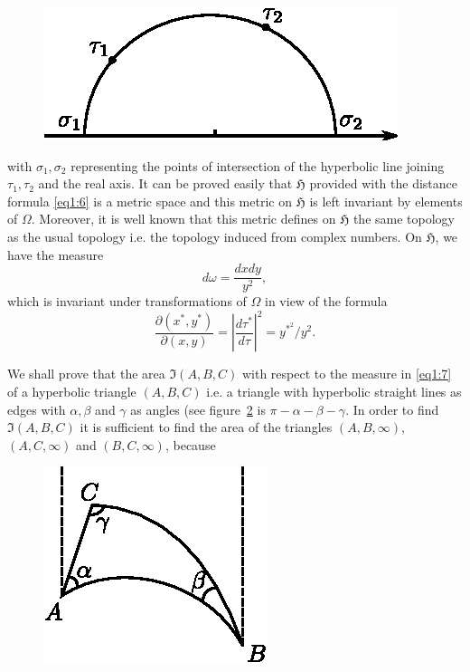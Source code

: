 \begin{figure}[H]
\centering
\includegraphics{vol29-fig/fig29-1.eps}
\smallskip
\caption{}
\label{chap1:fig1}
\end{figure}

with $\sigma_1, \sigma_2$ representing the points of intersection of
the hyperbolic line joining $\tau_1, \tau_2$ and the real axis. It can
be proved easily that $\mathfrak{H}$ provided with the distance
formula \eqref{eq1:6} is a metric space and this metric on $\mathfrak{H}$ is
left invariant by elements of $\Omega$. Moreover, it is well known
that this metric defines on $\mathfrak{H}$ the same topology as the
usual topology i.e. the topology induced from complex numbers. On
$\mathfrak{H}$, we have the measure
\begin{equation*}
d\omega = \frac{dx dy}{y^2}, \tag{7}\label{eq1:7}
\end{equation*}
which is invariant under transformations of $\Omega$ in view of the
formula
$$
\frac{\partial(x^{\ast}, y^{\ast})}{\partial(x,y)} =
\left|\frac{d\tau^{\ast}}{d\tau}\right|^2 = y^{\ast^2} /y^2.
$$

We shall prove that the area $\mathfrak{I}(A,B,C)$ with respect to the
measure in \eqref{eq1:7} of a hyperbolic triangle $(A,B,C)$ i.e. a triangle with
hyperbolic straight lines as edges with $\alpha, \beta$ and $\gamma$
as angles (see figure~\ref{chap1:fig2} is $\pi-\alpha-\beta-\gamma$. In order to
find $\mathfrak{I}(A,B,C)$ it is sufficient to find the area of the
triangles $(A,B,\infty)$, $(A,C,\infty)$ and $(B,C,\infty)$, because 

\begin{figure}[H]
\centering
\includegraphics{vol29-fig/fig29-2.eps}
\bigskip
\caption{}
\label{chap1:fig2}
\end{figure}

